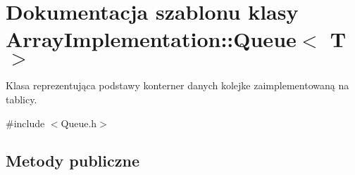 \hypertarget{class_array_implementation_1_1_queue}{\section{Dokumentacja szablonu klasy Array\-Implementation\-:\-:Queue$<$ T $>$}
\label{class_array_implementation_1_1_queue}
}


Klasa reprezentująca podstawy konterner danych kolejke zaimplementowaną na tablicy.  




{\ttfamily \#include $<$Queue.\-h$>$}

\subsection*{Metody publiczne}
